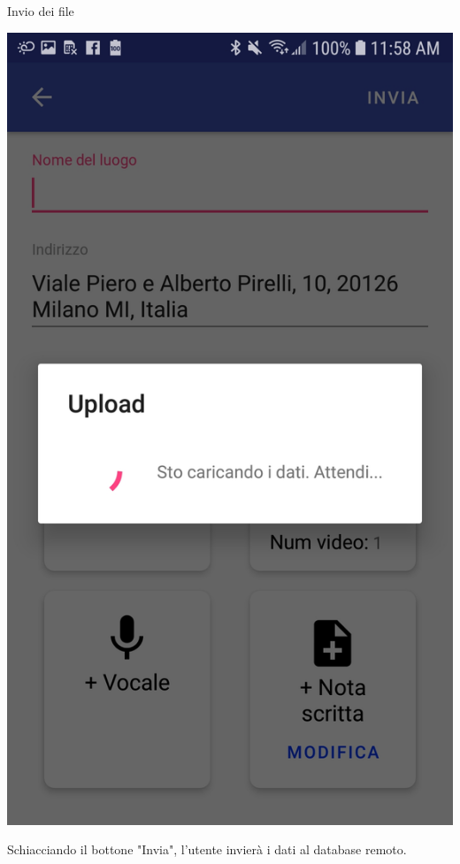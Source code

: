 \documentclass[11pt,aspectratio=169]{beamer}
\begin{document}
\begin{frame}{Invio dei file}
\noindent
    \begin{minipage}{0.3\textwidth}
    \includegraphics[scale=0.1]{Tesi/images/Progresso.jpg}
    \end{minipage}
\hfill
\begin{minipage}{0.6\textwidth}
Schiacciando il bottone "Invia", l'utente invierà i dati al database remoto.
\end{minipage}
\end{frame}
\end{document}
